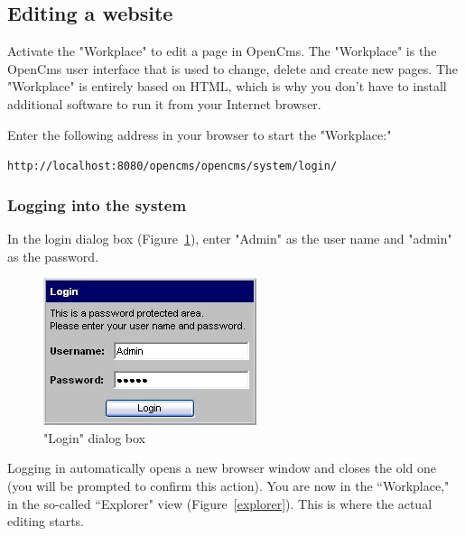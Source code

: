 \subsection{Editing a website}

Activate the "Workplace" to edit a page in OpenCms. The
"Workplace" is the OpenCms user interface that is used to change,
delete and create new pages. The "Workplace" is entirely based on
HTML, which is why you don't have to install additional software
to run it from your Internet browser.

Enter the following address in your browser to start the
"Workplace:"

{\tt http://localhost:8080/opencms/opencms/system/login/}

\subsubsection{Logging into the system}

In the login dialog box (Figure~\ref{loginbox}), enter "Admin" as
the user name and "admin" as the password.

\begin{figure}[!hbt]
\begin{minipage}[b]{0.35\linewidth}
   \begin{center}
\includegraphics[width=\sgw]
                   {pics/usermanual/loginBox}
\caption["Login" dialog box]
           {"Login" dialog box}
\label{loginbox}
   \end{center}
\end{minipage}
\hfill
\end{figure}

Logging in automatically opens a new browser window and closes the
old one (you will be prompted to confirm this action). You are now
in the ``Workplace," in the so-called ``Explorer" view
(Figure~\ref{explorer}). This is where the actual editing starts.

